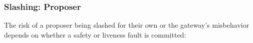 \documentclass[a4paper]{article}
\theoremstyle{boldstyle}
\newcommand{\todocm}[1]{\todo[color=blue!40]{\textbf{Conor:} #1}}
\newcommand{\todoqb}[1]{\todo[color=red!40]{\textbf{Quentin:} #1}}
\begin{document}

    \subsubsection{Slashing: Proposer} 
    \label{risk_slashing:proposer}
        The risk of a proposer being slashed for their own or the gateway's misbehavior depends on whether a safety or liveness fault is committed:
\end{document}
